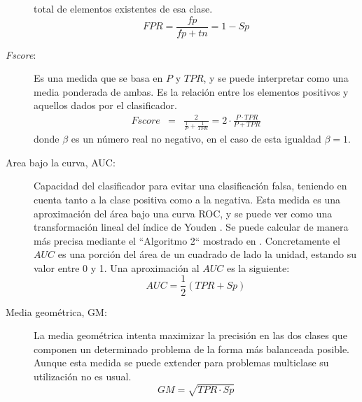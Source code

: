 \begin{description}
total de elementos existentes de esa clase.
\begin{displaymath}
FPR=\frac{fp}{fp+tn}=1-Sp
\end{displaymath}
\item[\textit{Fscore}:] Es una medida que se basa en $P$ y $TPR$, y se puede
interpretar como una media ponderada de ambas. Es la relación entre los elementos
positivos y aquellos dados por el clasificador.
\begin{eqnarray}
Fscore&=&\frac{2}{\frac{1}{P}+\frac{1}{TPR}} =
2\cdot \frac{P\cdot TPR}{
	P+TPR}
\nonumber
\end{eqnarray}
donde $\beta$ es un número real no negativo, en el caso de esta igualdad $\beta=1$.
\item[Area bajo la curva, AUC:]
Capacidad del
clasificador para evitar una clasificación falsa, teniendo en cuenta tanto a la clase
positiva como a la negativa. Esta medida es una aproximación del área bajo una curva
ROC, y se puede ver como una transformación lineal del índice de Youden
\cite{Youden1950}. Se puede calcular de manera más precisa mediante el ``Algoritmo 2``
mostrado en \cite{Fawcett2006}. Concretamente el $AUC$ es una porción del área de un
cuadrado de lado la unidad,
estando su valor entre 0 y 1. Una aproximación al $AUC$ es la siguiente:
\begin{displaymath}
AUC=\frac{1}{2}\left(TPR+Sp\right)
\end{displaymath}
\item[Media geométrica, GM:] La media geométrica intenta maximizar
la precisión en las dos clases que componen un determinado problema de la forma más
balanceada posible. Aunque esta medida se puede extender para problemas multiclase su
utilización no es usual.
\begin{displaymath}
GM=\sqrt{TPR\cdot Sp}
\end{displaymath}
\end{description}

